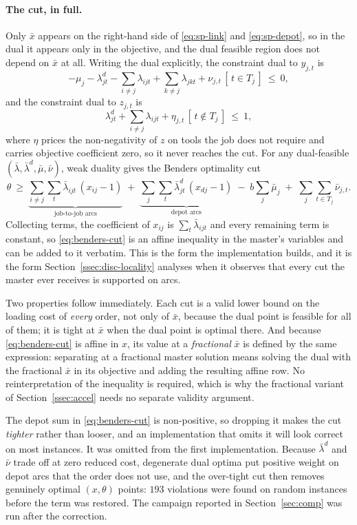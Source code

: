 \paragraph{The cut, in full.}
Only $\bar x$ appears on the right-hand side of \eqref{eq:sp-link} and
\eqref{eq:sp-depot}, so in the dual it appears only in the objective, and the dual
feasible region does not depend on $\bar x$ at all. Writing the dual explicitly, the
constraint dual to $y_{j,t}$ is
\[
  -\mu_j-\lambda^{d}_{jt}-\sum_{i\ne j}\lambda_{ijt}+\sum_{k\ne j}\lambda_{jkt}
  +\nu_{j,t}\,[\,t\in T_j\,]\ \le\ 0 ,
\]
and the constraint dual to $z_{j,t}$ is
\[
  \lambda^{d}_{jt}+\sum_{i\ne j}\lambda_{ijt}+\eta_{j,t}\,[\,t\notin T_j\,]\ \le\ 1 ,
\]
where $\eta$ prices the non-negativity of $z$ on tools the job does not require and
carries objective coefficient zero, so it never reaches the cut. For any dual-feasible
$(\bar\lambda,\bar\lambda^{d},\bar\mu,\bar\nu)$, weak duality gives the Benders
optimality cut
\begin{equation}\label{eq:benders-cut}
  \theta\ \ge\
  \underbrace{\sum_{i\ne j}\sum_{t}\bar\lambda_{ijt}\,(x_{ij}-1)}_{\text{job-to-job arcs}}
  \;+\;\underbrace{\sum_{j}\sum_{t}\bar\lambda^{d}_{jt}\,(x_{dj}-1)}_{\text{depot arcs}}
  \;-\;b\sum_{j}\bar\mu_j
  \;+\;\sum_{j}\sum_{t\in T_j}\bar\nu_{j,t}.
\end{equation}
Collecting terms, the coefficient of $x_{ij}$ is $\sum_t\bar\lambda_{ijt}$ and every
remaining term is constant, so \eqref{eq:benders-cut} is an affine inequality in the
master's variables and can be added to it verbatim. This is the form the implementation
builds, and it is the form Section~\ref{ssec:disc-locality} analyses when it observes
that every cut the master ever receives is supported on arcs.

Two properties follow immediately. Each cut is a valid lower bound on the loading cost
of \emph{every} order, not only of $\bar x$, because the dual point is feasible for all
of them; it is tight at $\bar x$ when the dual point is optimal there. And because
\eqref{eq:benders-cut} is affine in $x$, its value at a \emph{fractional} $\bar x$ is
defined by the same expression: separating at a fractional master solution means solving
the dual with the fractional $\bar x$ in its objective and adding the resulting affine
row. No reinterpretation of the inequality is required, which is why the fractional
variant of Section~\ref{ssec:accel} needs no separate validity argument.

\begin{remark}\label{rem:depotterm}
The depot sum in \eqref{eq:benders-cut} is non-positive, so dropping it makes the cut
\emph{tighter} rather than looser, and an implementation that omits it will look
correct on most instances. It was omitted from the first implementation. Because
$\bar\lambda^{d}$ and $\bar\nu$ trade off at zero reduced cost, degenerate dual optima
put positive weight on depot arcs that the order does not use, and the over-tight cut
then removes genuinely optimal $(x,\theta)$ points: $193$ violations were found on
random instances before the term was restored. The campaign reported in
Section~\ref{sec:comp} was run after the correction.
\end{remark}

